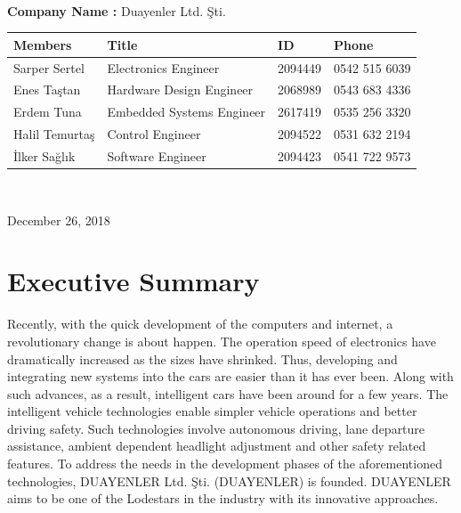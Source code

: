 \documentclass[a4paper,12pt]{article}
\begin{document}
\begin{titlepage}
\begin{minipage}[r]{0.35\textwidth}
		\end{minipage}\\[1cm]
		\begin{minipage}{\textwidth}
			\begin{flushleft}
				\large{\textbf{Company Name :}}	Duayenler Ltd. Şti.\\
				\begin{table}[H]
					\begin{tabular}{l l l l}
						\hline
						\textbf{Members} & \textbf{Title}            & \textbf{ID} & \textbf{Phone} \\ \hline
						Sarper Sertel    & Electronics Engineer      & 2094449     & 0542 515 6039  \\ 
						Enes Taştan     & Hardware Design Engineer  & 2068989     & 0543 683 4336  \\ 
						Erdem Tuna       & Embedded Systems Engineer & 2617419     & 0535 256 3320  \\ 
						Halil Temurtaş  & Control Engineer          & 2094522     & 0531 632 2194  \\
						İlker Sağlık  & Software Engineer         & 2094423     & 0541 722 9573  \\ \hline
						
						
					\end{tabular}
				\end{table}
			\end{flushleft}
		\end{minipage}\\[1cm]
		
		\begin{flushbottom}
			{\large December 26, 2018} %
		\end{flushbottom}
		
	\end{titlepage}
	
	\tableofcontents
	\newpage
	
	\section{Executive Summary}
	Recently, with the quick development of the computers and internet, a revolutionary change is about happen. The operation speed of electronics have dramatically increased as the sizes have shrinked. Thus, developing and integrating new systems into the cars are easier than it has ever been. Along with such advances, as a result, intelligent cars have been around for a few years. The intelligent vehicle technologies enable simpler vehicle operations and better driving safety. Such technologies involve autonomous driving, lane departure assistance, ambient dependent headlight adjustment and other safety related features. To address the needs in the development phases of the aforementioned technologies, DUAYENLER Ltd. Şti. (DUAYENLER) is founded. DUAYENLER aims to be one of the Lodestars in the industry with its innovative approaches.\\
	
\end{document}
